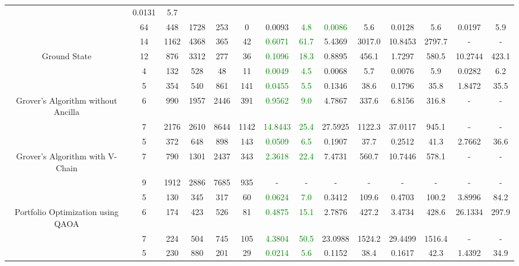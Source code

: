 \begin{table}[htb]
{\begin{tabular}{|c|c|c|c|c|c|c|c|c|c|c|c|c|c|}
 & 0.0131 & 5.7
 \\
 & 
64 & 448 & 1728 & 253 & 0
 & 0.0093 & \textcolor{green}{4.8}
 & \textcolor{green}{0.0086} & 5.6
 & 0.0128 & 5.6
 & 0.0197 & 5.9
 \\
\hline
 & 
14 & 1162 & 4368 & 365 & 42
 & \textcolor{green}{0.6071} & \textcolor{green}{61.7}
 & 5.4369 & 3017.0
 & 10.8453 & 2797.7
 & - & -
 \\
Ground State & 
12 & 876 & 3312 & 277 & 36
 & \textcolor{green}{0.1096} & \textcolor{green}{18.3}
 & 0.8895 & 456.1
 & 1.7297 & 580.5
 & 10.2744 & 423.1
 \\
 & 
4 & 132 & 528 & 48 & 11
 & \textcolor{green}{0.0049} & \textcolor{green}{4.5}
 & 0.0068 & 5.7
 & 0.0076 & 5.9
 & 0.0282 & 6.2
 \\
\hline
 & 
5 & 354 & 540 & 861 & 141
 & \textcolor{green}{0.0455} & \textcolor{green}{5.5}
 & 0.1346 & 38.6
 & 0.1796 & 35.8
 & 1.8472 & 35.5
 \\
Grover's Algorithm without Ancilla & 
6 & 990 & 1957 & 2446 & 391
 & \textcolor{green}{0.9562} & \textcolor{green}{9.0}
 & 4.7867 & 337.6
 & 6.8156 & 316.8
 & - & -
 \\
 & 
7 & 2176 & 2610 & 8644 & 1142
 & \textcolor{green}{14.8443} & \textcolor{green}{25.4}
 & 27.5925 & 1122.3
 & 37.0117 & 945.1
 & - & -
 \\
\hline
 & 
5 & 372 & 648 & 898 & 143
 & \textcolor{green}{0.0509} & \textcolor{green}{6.5}
 & 0.1907 & 37.7
 & 0.2512 & 41.3
 & 2.7662 & 36.6
 \\
Grover's Algorithm with V-Chain & 
7 & 790 & 1301 & 2437 & 343
 & \textcolor{green}{2.3618} & \textcolor{green}{22.4}
 & 7.4731 & 560.7
 & 10.7446 & 578.1
 & - & -
 \\
 & 
9 & 1912 & 2886 & 7685 & 935
 & - & -
 & - & -
 & - & -
 & - & -
 \\
\hline
 & 
5 & 130 & 345 & 317 & 60
 & \textcolor{green}{0.0624} & \textcolor{green}{7.0}
 & 0.3412 & 109.6
 & 0.4703 & 100.2
 & 3.8996 & 84.2
 \\
Portfolio Optimization using QAOA & 
6 & 174 & 423 & 526 & 81
 & \textcolor{green}{0.4875} & \textcolor{green}{15.1}
 & 2.7876 & 427.2
 & 3.4734 & 428.6
 & 26.1334 & 297.9
 \\
 & 
7 & 224 & 504 & 745 & 105
 & \textcolor{green}{4.3804} & \textcolor{green}{50.5}
 & 23.0988 & 1524.2
 & 29.4499 & 1516.4
 & - & -
 \\
\hline
 & 
5 & 230 & 880 & 201 & 29
 & \textcolor{green}{0.0214} & \textcolor{green}{5.6}
 & 0.1152 & 38.4
 & 0.1617 & 42.3
 & 1.4392 & 34.9
 \\

\end{tabular}}
\end{table}

